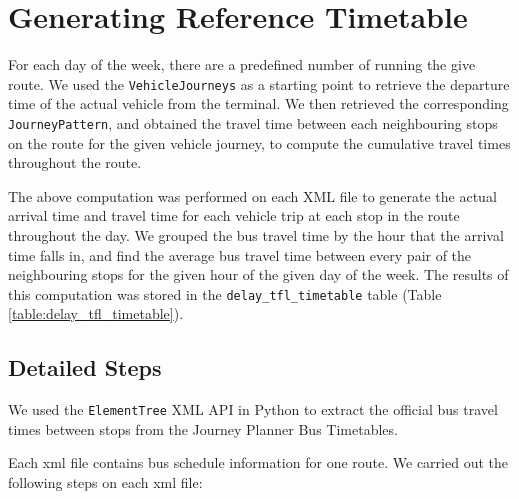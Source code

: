 \section{Generating Reference Timetable}
\label{sec: official_tfl_timetable}
For each day of the week, there are a predefined number of running the give route. We used the \texttt{VehicleJourneys} as a starting point to retrieve the departure time of the actual vehicle from the terminal. We then retrieved the corresponding \texttt{JourneyPattern}, and obtained the travel time between each neighbouring stops on the route for the given vehicle journey, to compute the cumulative travel times throughout the route.

The above computation was performed on each XML file to generate the actual arrival time and travel time for each vehicle trip at each stop in the route throughout the day. We grouped the bus travel time by the hour that the arrival time falls in, and find the average bus travel time between every pair of the neighbouring stops for the given hour of the given day of the week. The results of this computation was stored in the \texttt{delay\_tfl\_timetable} table (Table \ref{table:delay_tfl_timetable}).

\subsection{Detailed Steps}

\par We used the \texttt{ElementTree} XML API in Python \cite{elementtree} to extract the official bus travel times between stops from the Journey Planner Bus Timetables\cite{open_data_feeds_description}.

\par Each \acrshort{xml} file contains bus schedule information for one route. We carried out the following steps on each \acrshort{xml} file:

